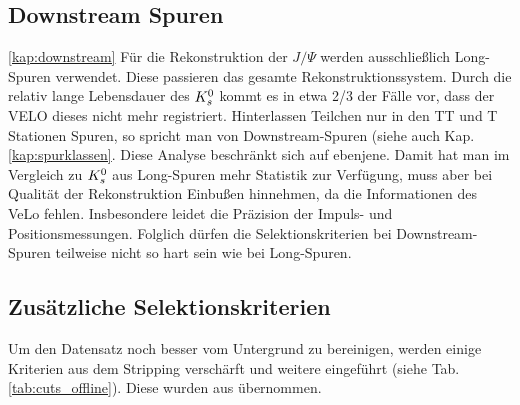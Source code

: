 \subsection{Downstream Spuren} \ref{kap:downstream}
Für die Rekonstruktion der $J/\Psi$ werden ausschließlich \glqq Long\grqq-Spuren verwendet. Diese passieren das gesamte Rekonstruktionssystem. Durch die relativ lange Lebensdauer des $K_s^0$ kommt es in etwa 2/3 der Fälle vor, dass der VELO dieses nicht mehr registriert. Hinterlassen Teilchen nur in den TT und T Stationen Spuren, so spricht man von \glqq Downstream\grqq-Spuren (siehe auch Kap. \ref{kap:spurklassen}. Diese Analyse beschränkt sich auf ebenjene. Damit hat man im Vergleich zu $K_s^0$ aus Long-Spuren mehr Statistik zur Verfügung, muss aber bei Qualität der Rekonstruktion Einbußen hinnehmen, da die Informationen des VeLo fehlen. Insbesondere leidet die Präzision der Impuls- und Positionsmessungen. Folglich dürfen die Selektionskriterien bei Downstream-Spuren teilweise nicht so hart sein wie bei Long-Spuren. \cite{lhcp-paper}

\subsection{Zusätzliche Selektionskriterien}
Um den Datensatz noch besser vom Untergrund zu bereinigen, werden einige Kriterien aus dem Stripping verschärft und weitere eingeführt (siehe Tab. \ref{tab:cuts_offline}). Diese wurden aus \cite{lhcb-paper} übernommen.

